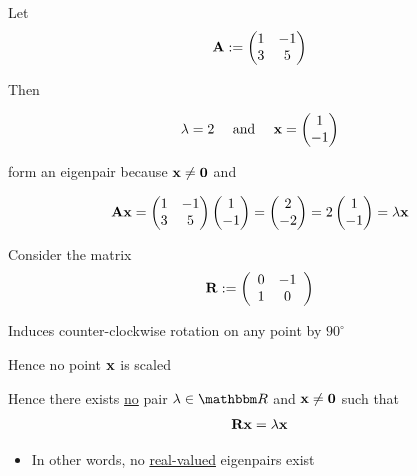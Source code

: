 \begin{frame}
    
    \vspace{2em}
    \Eg Let
    $$
    \mathbf A :=
    \begin{pmatrix}
        1 & -1 \\
        3 & 5
    \end{pmatrix}
    $$

    Then
    
    $$
    \lambda = 2 
    \quad \text{ and } \quad
    {\mathbf x}
    =
    \begin{pmatrix}
        1 \\
        -1
    \end{pmatrix}
    $$

    form an eigenpair because ${\mathbf x} \not= {\mathbf 0}$ and

    $$
    \mathbf A {\mathbf x} =
    \begin{pmatrix}
        1 & -1 \\
        3 & 5
    \end{pmatrix}
    \begin{pmatrix}
        1 \\
        -1
    \end{pmatrix}
    =
    \begin{pmatrix}
        2 \\
        -2
    \end{pmatrix}
    = 2
    \begin{pmatrix}
        1 \\
        -1
    \end{pmatrix}
    =
    \lambda {\mathbf x} 
    $$

\end{frame}

\begin{frame}
    
    \vspace{2em}
    \Eg Consider the matrix 
    \begin{equation*}
        \mathbf R := 
        \left(
        \begin{array}{cc}
            0 & -1  \\
            1 & 0  \\
        \end{array}
        \right)
    \end{equation*}

    Induces counter-clockwise rotation on any point by $90^{\circ}$

    Hence no point ${\mathbf x}$ is scaled
    
    Hence there exists \underline{no} pair $\lambda \in \RR$ and ${\mathbf x} \not=
    {\mathbf 0}$
    such that
    $$\mathbf R {\mathbf x} = \lambda {\mathbf x}$$  
    
    \begin{itemize}
        \item In other words, no \underline{real-valued} eigenpairs exist
    \end{itemize}


\end{frame}

